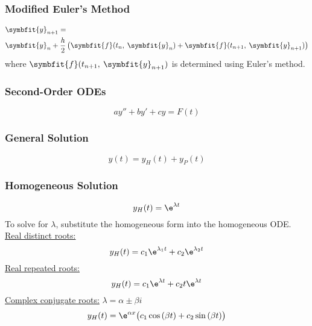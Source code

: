 \documentclass{article}
\begin{document}
\begin{multicols}{3}
    \subsubsection*{Modified Euler's Method}
    \begin{align*}
         & \symbfit{y}_{n+1} =                                                                                                       \\
         & \symbfit{y}_{n} + \frac{h}{2}\left( \symbfit{f}(t_n,\: \symbfit{y}_n) + \symbfit{f}(t_{n+1},\: \symbfit{y}_{n+1}) \right)
    \end{align*}
    where $\symbfit{f}(t_{n+1},\: \symbfit{y}_{n+1})$ is determined using Euler's method.
    \subsubsection*{Second-Order ODEs}
    \begin{equation*}
        ay'' + by' + cy = F(t)
    \end{equation*}
    \subsubsection*{General Solution}
    \begin{equation*}
        y(t) = y_H(t) + y_P(t)
    \end{equation*}
    \subsubsection*{Homogeneous Solution}
    \begin{equation*}
        y_H(t) = \e^{\lambda t}
    \end{equation*}
    To solve for $\lambda$, substitute the homogeneous form into the homogeneous ODE. \\
    \underline{Real distinct roots:}
    \begin{equation*}
        y_H(t) = c_1\e^{\lambda_1 t} + c_2\e^{\lambda_2 t}
    \end{equation*}
    \underline{Real repeated roots:}
    \begin{equation*}
        y_H(t) = c_1\e^{\lambda t} + c_2 t\e^{\lambda t}
    \end{equation*}
    \underline{Complex conjugate roots:} $\lambda = \alpha \pm \beta i$
    \begin{equation*}
        y_H(t) = \e^{\alpha x}\bigl( c_1\cos{\left( \beta t \right)} + c_2 \sin{\left( \beta t \right)} \bigr)
    \end{equation*}

\end{multicols}
\end{document}
